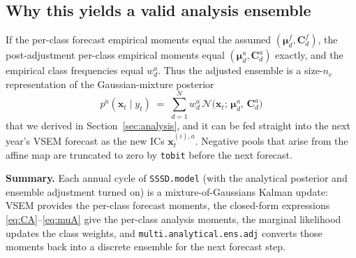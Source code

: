 \documentclass[11pt]{article}
\begin{document}
\subsection{Why this yields a valid analysis ensemble}

If the per-class forecast empirical moments equal the assumed
$(\bm\mu^{f}_d, \bm C^{f}_d)$, the post-adjustment per-class empirical
moments equal $(\bm\mu^{a}_d, \bm C^{a}_d)$ exactly, and the empirical
class frequencies equal $w^{a}_d$.  Thus the adjusted ensemble is a
size-$n_e$ representation of the Gaussian-mixture posterior
\[
  p^{a}(\bm x_t \mid y_t)
  \;=\;
  \sum_{d=1}^{N} w^{a}_d\,
                 \mathcal N\!\bigl(\bm x_t;\, \bm\mu^{a}_d,\, \bm C^{a}_d\bigr)
\]
that we derived in Section~\ref{sec:analysis}, and it can be fed
straight into the next year's VSEM forecast as the new ICs
$\bm x^{(i),a}_t$.  Negative pools that arise from the affine map are
truncated to zero by \texttt{tobit} before the next forecast.

\bigskip

\noindent
\textbf{Summary.}  Each annual cycle of \texttt{SSSD.model} (with the
analytical posterior and ensemble adjustment turned on) is a
mixture-of-Gaussians Kalman update: VSEM provides the per-class forecast
moments, the closed-form expressions \eqref{eq:CA}--\eqref{eq:muA} give
the per-class analysis moments, the marginal likelihood updates the
class weights, and \texttt{multi.analytical.ens.adj} converts those
moments back into a discrete ensemble for the next forecast step.
\end{document}
